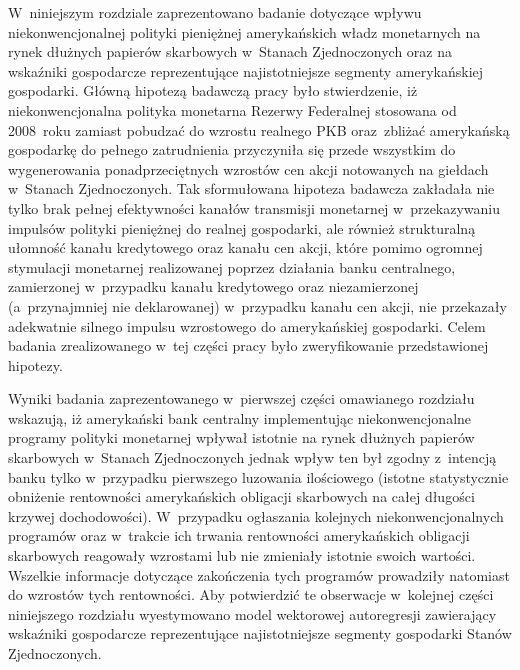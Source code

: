 W~niniejszym rozdziale zaprezentowano badanie dotyczące wpływu niekonwencjonalnej polityki pieniężnej amerykańskich władz monetarnych na rynek dłużnych papierów skarbowych w~Stanach Zjednoczonych oraz na wskaźniki gospodarcze reprezentujące najistotniejsze segmenty amerykańskiej gospodarki. Główną hipotezą badawczą pracy było stwierdzenie, iż niekonwencjonalna polityka monetarna Rezerwy Federalnej stosowana od 2008~roku zamiast pobudzać do wzrostu realnego \acs{PKB} oraz~zbliżać amerykańską gospodarkę do pełnego zatrudnienia przyczyniła się przede wszystkim do wygenerowania ponadprzeciętnych wzrostów cen akcji notowanych na giełdach w~Stanach Zjednoczonych. Tak sformułowana hipoteza badawcza zakładała nie tylko brak pełnej efektywności kanałów transmisji monetarnej w~przekazywaniu impulsów polityki pieniężnej do realnej gospodarki, ale również strukturalną ułomność kanału kredytowego oraz kanału cen akcji, które pomimo ogromnej stymulacji monetarnej realizowanej poprzez działania banku centralnego, zamierzonej w~przypadku kanału kredytowego oraz niezamierzonej (a~przynajmniej nie deklarowanej) w~przypadku kanału cen akcji, nie przekazały adekwatnie silnego impulsu wzrostowego do amerykańskiej gospodarki. Celem badania zrealizowanego w~tej części pracy było zweryfikowanie przedstawionej hipotezy.

Wyniki badania zaprezentowanego w~pierwszej części omawianego rozdziału wskazują, iż amerykański bank centralny implementując niekonwencjonalne programy polityki monetarnej wpływał istotnie na rynek dłużnych papierów skarbowych w~Stanach Zjednoczonych jednak wpływ ten był zgodny z~intencją banku tylko w~przypadku pierwszego luzowania ilościowego (istotne statystycznie obniżenie rentowności amerykańskich obligacji skarbowych na całej długości krzywej dochodowości). W~przypadku ogłaszania kolejnych niekonwencjonalnych programów oraz w~trakcie ich trwania rentowności amerykańskich obligacji skarbowych reagowały wzrostami lub nie zmieniały istotnie swoich wartości. Wszelkie informacje dotyczące zakończenia tych programów prowadziły natomiast do wzrostów tych rentowności. Aby potwierdzić te obserwacje w~kolejnej części niniejszego rozdziału wyestymowano model wektorowej autoregresji zawierający wskaźniki gospodarcze reprezentujące najistotniejsze segmenty gospodarki Stanów Zjednoczonych.

